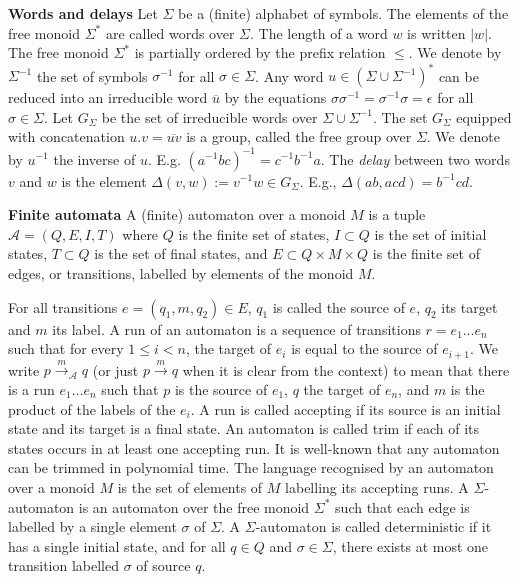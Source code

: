 \documentclass[envcountsame]{llncs}
\begin{document}
\vspace{2mm}
\noindent \textbf{Words and delays} Let $\Sigma$ be a (finite)
alphabet of symbols. The elements of the free monoid $\Sigma^*$ are
called words over $\Sigma$. The length of a word $w$ is written $|w|$.
The free monoid $\Sigma^*$ is partially ordered by the prefix relation
$\leq$. We denote by $\Sigma^{-1}$ the set of
symbols $\sigma^{-1}$ for all $\sigma\in\Sigma$. Any word $u\in
(\Sigma\cup \Sigma^{-1})^*$ can be reduced into an irreducible word $\overline{u}$ by the equations
$\sigma\sigma^{-1} = \sigma^{-1}\sigma = \epsilon$ for all
$\sigma\in\Sigma$. Let $G_\Sigma$ be the set of irreducible words over
$\Sigma\cup \Sigma^{-1}$. The set $G_\Sigma$ equipped with concatenation $u.v =
\overline{uv}$ is a group, called the free group over $\Sigma$. We denote by $u^{-1}$ the inverse
of $u$. E.g. $(a^{-1}bc)^{-1} = c^{-1}b^{-1}a$. The \emph{delay} between two words $v$ and $w$ is the element
$\Delta(v,w) := v^{-1} w \in G_\Sigma$. E.g., $\Delta(ab,acd) =
b^{-1}cd$. 


\vspace{2mm}
\noindent \textbf{Finite automata} A (finite) automaton
over a monoid $M$ is a tuple $\mathcal{A} = (Q,E,I,T)$ where $Q$ is the finite set
of states, $I \subset Q$ is the set of initial states, $T \subset Q$
is the set of final states, and $E \subset Q \times M \times Q$ is the
finite set of edges, or transitions, labelled by elements of the monoid $M$.

For all transitions $e = (q_1,m,q_2) \in E$, $q_1$ is called the source of $e$, $q_2$ its target and $m$ its label.
A run of an automaton is a sequence of transitions $r = e_1 \ldots
e_n$ such that for every $1 \leq i < n$, the target of $e_i$ is equal
to the source of $e_{i+1}$. We write $p \xrightarrow{m}_{\mathcal{A}}
q$ (or just $p \xrightarrow{m} q$ when it is clear from the context) to mean
that there is a run $e_1\dots e_n$ such that $p$ is the source of
$e_1$, $q$ the target of $e_n$, and $m$ is the product of the labels
of the $e_i$. A run is called accepting if its source is an initial state and its target is a final state.
An automaton is called trim if each of its states occurs in at least
one accepting run. It is well-known that any automaton can be trimmed
in polynomial time. The language recognised by an automaton over a monoid $M$ is the set of elements of $M$ labelling its accepting runs.
A $\Sigma$-automaton is an automaton over the free monoid $\Sigma^*$ such that each edge is labelled by a single element $\sigma$ of $\Sigma$.
A $\Sigma$-automaton is called deterministic if it has a single initial state,
and for all $q \in Q$ and $\sigma \in \Sigma$, there exists at most one
transition labelled $\sigma$ of source $q$.
\end{document}
